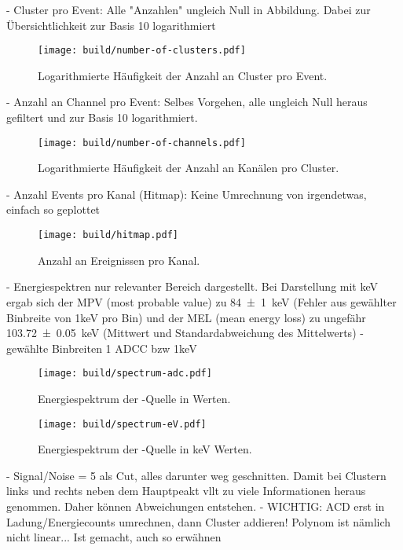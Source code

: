 - Cluster pro Event: Alle "Anzahlen" ungleich Null in Abbildung.
Dabei zur Übersichtlichkeit zur Basis 10 logarithmiert
\begin{figure}
  \centering
  \texttt{[image: build/number-of-clusters.pdf]}  %
  \caption{Logarithmierte Häufigkeit der Anzahl an Cluster pro Event.}
  \label{fig:number-of-clusters}
\end{figure}
- Anzahl an Channel pro Event: Selbes Vorgehen, alle ungleich Null heraus gefiltert
und zur Basis 10 logarithmiert.
\begin{figure}
  \centering
  \texttt{[image: build/number-of-channels.pdf]}  %
  \caption{Logarithmierte Häufigkeit der Anzahl an Kanälen pro Cluster.}
  \label{fig:number-of-channels}
\end{figure}
- Anzahl Events pro Kanal (Hitmap): Keine Umrechnung von irgendetwas, einfach so geplottet
\begin{figure}
  \centering
  \texttt{[image: build/hitmap.pdf]}  %
  \caption{Anzahl an Ereignissen pro Kanal.}
  \label{fig:hitmap}
\end{figure}
- Energiespektren nur relevanter Bereich dargestellt. Bei Darstellung mit keV
ergab sich der MPV (most probable value) zu \SI{84(1)}{\kilo\electronvolt}
(Fehler aus gewählter Binbreite von 1keV pro Bin)
und der MEL (mean energy loss)
zu ungefähr \SI{103.72(5)}{\kilo\electronvolt}
(Mittwert und Standardabweichung des Mittelwerts)
- gewählte Binbreiten 1 ADCC bzw 1keV
\begin{figure}
  \centering
  \texttt{[image: build/spectrum-adc.pdf]}  %
  \caption{Energiespektrum der -Quelle in \si{\adc} Werten.}
  \label{fig:spectrum-adc}
\end{figure}
\begin{figure}
  \centering
  \texttt{[image: build/spectrum-eV.pdf]}  %
  \caption{Energiespektrum der -Quelle in \si{\kilo\electronvolt} Werten.}
  \label{fig:spectrum-eV}
\end{figure}
- Signal/Noise = 5 als Cut, alles darunter weg geschnitten. Damit bei Clustern
links und rechts neben dem Hauptpeakt vllt zu viele Informationen heraus genommen.
Daher können Abweichungen entstehen.
- WICHTIG: ACD erst in Ladung/Energiecounts umrechnen, dann Cluster addieren!
Polynom ist nämlich nicht linear... Ist gemacht, auch so erwähnen
